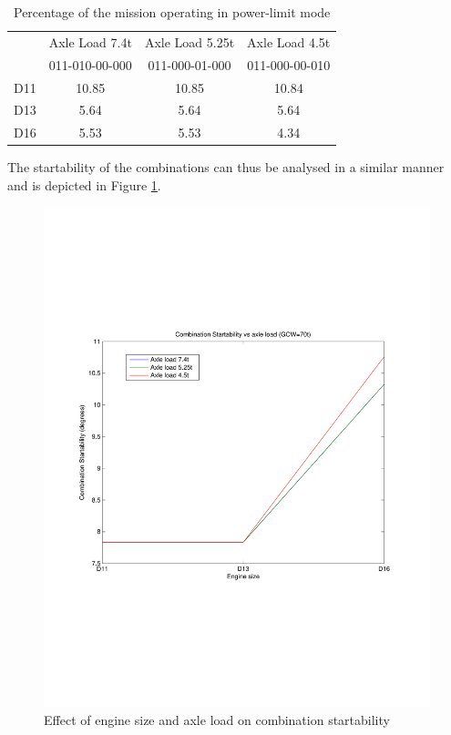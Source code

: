 \documentclass{article}
\begin{document}
\begin{table}[h!]                                       
\centering                                              
\begin{tabular}{|c|c|c|c|}                              
\hline                                                  
 & Axle Load 7.4t & Axle Load 5.25t & Axle Load 4.5t \\
 & 011-010-00-000 & 011-000-01-000 & 011-000-00-010 \\
\hline                                                  
D11 & 10.85 & 10.85 & 10.84 \\                            
\hline                                                  
D13 & 5.64 & 5.64 & 5.64 \\ 
\hline                              
D16 & 5.53 & 5.53 & 4.34 \\                                
\hline                                                  
\end{tabular}                                           
\caption{Percentage of the mission operating in power-limit mode}                                
\label{table:powerLimitMode}                              
\end{table}  

The startability of the combinations can thus be analysed in a similar manner and is depicted in Figure \ref{startabilityEngineAxleLoad}.\\

\begin{figure}[h!]
\centering
\includegraphics[width=0.5\linewidth, clip=true, trim=45 185 65 208]{Figures/Effect_of_axle_load/Combination_startability_vs_axle_load_and_engine_size.pdf}
\caption{Effect of engine size and axle load on combination startability}
\label{startabilityEngineAxleLoad}
\end{figure}
\end{document}

